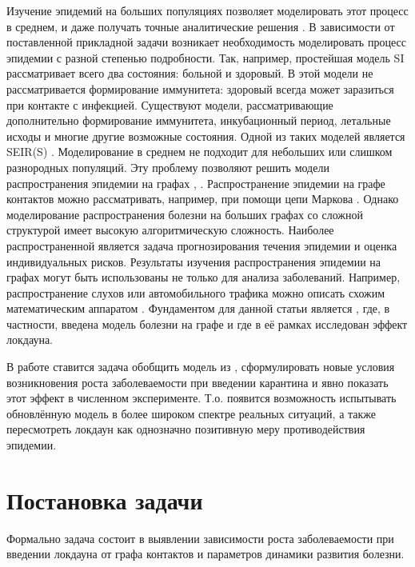 	Изучение эпидемий на больших популяциях позволяет моделировать этот процесс в среднем, и даже получать точные аналитические решения \cite{harko2014exact}. В зависимости от поставленной прикладной задачи возникает необходимость моделировать процесс эпидемии с разной степенью подробности. Так, например, простейшая модель SI \cite{allen1994some} рассматривает всего два состояния: больной и здоровый. В этой модели не рассматривается формирование иммунитета: здоровый всегда может заразиться при контакте с инфекцией. Существуют модели, рассматривающие дополнительно формирование иммунитета, инкубационный период, летальные исходы и многие другие возможные состояния. Одной из таких моделей является SEIR(S) \cite{capasso2008mathematical}. Моделирование в среднем не подходит для небольших или слишком разнородных популяций. Эту проблему позволяют решить модели распространения эпидемии на графах \cite{moreno2002epidemic}, \cite{pastor2015epidemic}. Распространение эпидемии на графе контактов можно рассматривать, например, при помощи цепи Маркова \cite{gomez2010discrete}. Однако моделирование распространения болезни на больших графах со сложной структурой имеет высокую алгоритмическую сложность. Наиболее распространенной является задача прогнозирования течения эпидемии \cite{leitch2019toward} и оценка индивидуальных рисков. Результаты изучения распространения эпидемии на графах	могут быть использованы не только для анализа заболеваний. Например, распространение слухов или автомобильного трафика можно описать схожим математическим аппаратом \cite{de2013anatomy}. Фундаментом для данной статьи является \cite{base_article}, где, в частности, введена модель болезни на графе и где в её рамках исследован эффект локдауна.
	
	В работе ставится задача обобщить модель из \cite{base_article}, сформулировать новые условия возникновения роста заболеваемости при введении карантина и явно показать этот эффект в численном эксперименте. Т.о. появится возможность испытывать обновлённую модель в более широком спектре реальных ситуаций, а также пересмотреть локдаун как однозначно позитивную меру противодействия эпидемии.
	
	\section*{Постановка задачи}
	
	Формально задача состоит в выявлении зависимости роста заболеваемости при введении локдауна от графа контактов и параметров динамики развития болезни.
	
